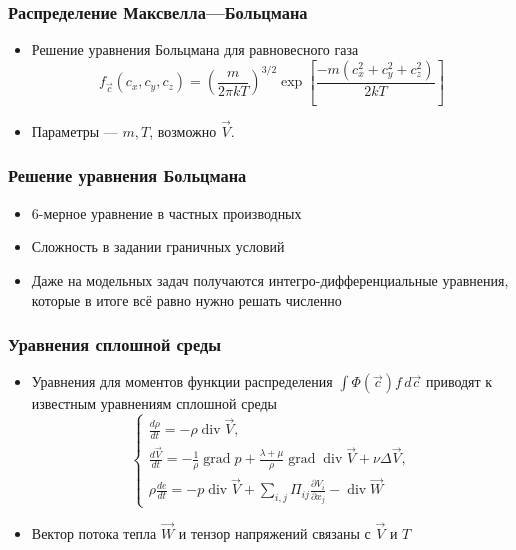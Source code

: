 \documentclass[onlymath]{beamer}
\newcommand{\pardiff}[2]{\frac{\partial{#1}}{\partial{#2}}}
\DeclareMathOperator\diverg{div}
\DeclareMathOperator\gradient{grad}
\begin{document}
\begin{frame}
  \frametitle{Распределение Максвелла—Больцмана}
  \begin{itemize}
  \item Решение уравнения Больцмана для равновесного газа
    \begin{equation*}
      f_{\vec{c}}(c_x, c_y, c_z) = \left(\frac{m}{2\pi k T}\right)^{3/2}
      \exp\left[ \frac{-m(c_x^2 + c_y^2 + c_z^2)}{2kT} \right]
    \end{equation*}
  \item Параметры — $m, T$, возможно $\vec{V}$.
  \end{itemize}
\end{frame}

\begin{frame}
  \frametitle{Решение уравнения Больцмана}
  \begin{itemize}
  \item 6-мерное уравнение в частных производных
  \item Сложность в задании граничных условий
  \item Даже на модельных задач получаются интегро-дифференциальные
    уравнения, которые в итоге всё равно нужно решать численно
  \end{itemize}
\end{frame}

\begin{frame}
  \frametitle{Уравнения сплошной среды}

  \begin{itemize}
  \item Уравнения для моментов функции распределения
    $\int\Phi(\vec{c}) f \,d\vec{c}$ приводят к известным уравнениям
    сплошной среды
    \begin{equation*}
      \begin{cases}
        \frac{d\rho}{dt} = -\rho \diverg {\vec{V}},\\
        \frac{d\vec{V}}{dt} = -\frac{1}{\rho}\gradient{p} + \frac{\lambda
          + \mu}{\rho}\gradient\diverg\vec{V} + \nu\Delta\vec{V},\\
        \rho\frac{de}{dt} = -p\diverg\vec{V}+\sum_{i,j}{\Pi_{ij}\pardiff{V_i}{x_j}}-\diverg\vec{W}
      \end{cases}
    \end{equation*}
  \item Вектор потока тепла $\vec{W}$ и тензор напряжений связаны с
    $\vec{V}$ и $T$
  \end{itemize}
\end{frame}
\end{document}
